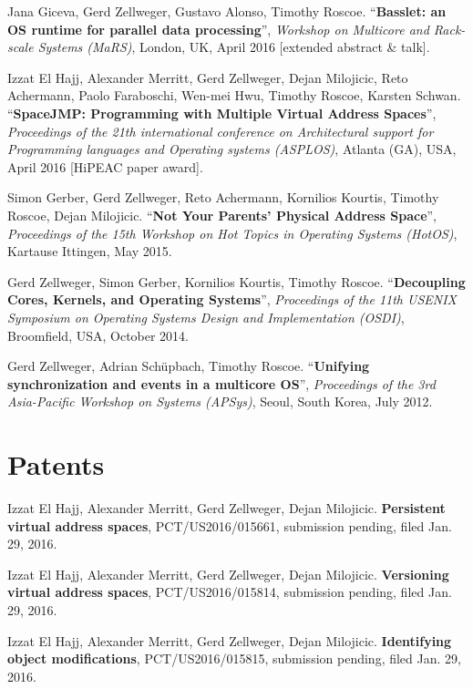 \documentclass[margin,line]{resume}
\begin{document}
\begin{resume}
    Jana Giceva, Gerd Zellweger, Gustavo Alonso, Timothy Roscoe.
    ``\textbf{Basslet: an OS runtime for parallel data processing}'',
    \textsl{Workshop on Multicore and Rack-scale Systems (MaRS)}, London, UK, April 2016 [extended abstract \& talk].

    Izzat El Hajj, Alexander Merritt, Gerd Zellweger, Dejan Milojicic, Reto Achermann, Paolo Faraboschi, Wen-mei Hwu, Timothy Roscoe, Karsten Schwan.
    ``\textbf{SpaceJMP: Programming with Multiple Virtual Address Spaces}'',  \textsl{Proceedings of the 21th international conference on Architectural support for Programming languages and Operating systems (ASPLOS)}, Atlanta (GA), USA, April 2016 [HiPEAC paper award].

    Simon Gerber, Gerd Zellweger, Reto Achermann, Kornilios Kourtis, Timothy Roscoe, Dejan Milojicic.
    ``\textbf{Not Your Parents' Physical Address Space}'', \textsl{Proceedings of the 15th Workshop on Hot Topics in Operating Systems (HotOS)}, Kartause Ittingen, May 2015.

    Gerd Zellweger, Simon Gerber, Kornilios Kourtis, Timothy Roscoe.
    ``\textbf{Decoupling Cores, Kernels, and Operating Systems}'',
    \textsl{Proceedings of the 11th USENIX Symposium on Operating Systems Design and Implementation (OSDI)}, Broomfield, USA, October 2014.

    Gerd Zellweger, Adrian Schüpbach, Timothy Roscoe.
    ``\textbf{Unifying synchronization and events in a multicore OS}'',
    \textsl{Proceedings of the 3rd Asia-Pacific Workshop on Systems (APSys)}, Seoul, South Korea, July 2012.



    \section{\mysidestyle Patents}

    Izzat El Hajj, Alexander Merritt, Gerd Zellweger, Dejan Milojicic.
    \textbf{Persistent virtual address spaces}, PCT/US2016/015661, submission
    pending, filed Jan. 29, 2016.

    Izzat El Hajj, Alexander Merritt, Gerd Zellweger, Dejan Milojicic.
    \textbf{Versioning virtual address spaces}, PCT/US2016/015814, submission
    pending, filed Jan. 29, 2016.

    Izzat El Hajj, Alexander Merritt, Gerd Zellweger, Dejan Milojicic.
    \textbf{Identifying object modifications}, PCT/US2016/015815, submission
    pending, filed Jan. 29, 2016.


\end{resume}
\end{document}
